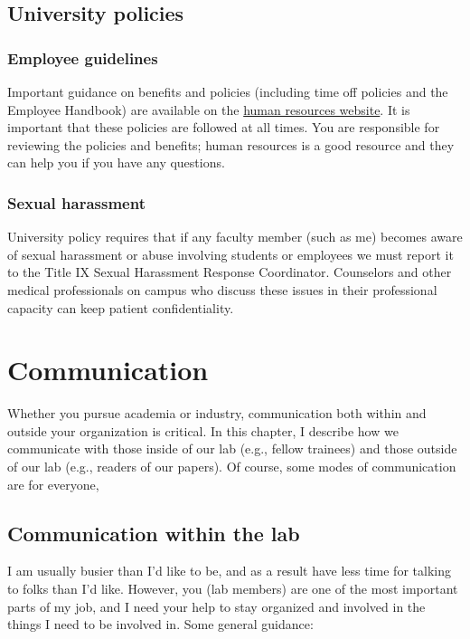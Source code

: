 \documentclass[letterpaper,12pt,oneside]{memoir}
\begin{document}
\section{University policies}

\subsection{Employee guidelines}
Important guidance on benefits and policies (including time off policies and the Employee Handbook) are available on the \href{https://www.temple.edu/faculty-and-staff/working-temple/human-resources}{human resources website}. It is important that these policies are followed at all times. You are responsible for reviewing the policies and benefits; human resources is a good resource and they can help you if you have any questions.

\subsection{Sexual harassment}
University policy requires that if any faculty member (such as me) becomes aware of sexual harassment or abuse involving students or employees we must report it to the Title IX Sexual Harassment Response Coordinator. Counselors and other medical professionals on campus who discuss these issues in their professional capacity can keep patient confidentiality.



\chapter{Communication}

Whether you pursue academia or industry, communication both within and outside your organization is critical. In this chapter, I describe how we communicate with those inside of our lab (e.g., fellow trainees) and those outside of our lab (e.g., readers of our papers). Of course, some modes of communication are for everyone, 

\section{Communication within the lab}
\label{sec:communicationInLab}

I am usually busier than I'd like to be, and as a result have less time for talking to folks than I'd like. However, you (lab members) are one of the most important parts of my job, and I need your help to stay organized and involved in the things I need to be involved in. Some general guidance:
\end{document}
